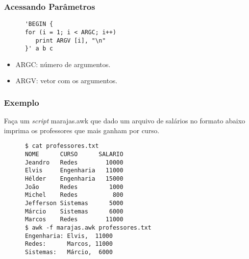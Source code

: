 \documentclass{beamer}
\begin{document}
   \begin{frame}[fragile]
      \frametitle{Acessando Parâmetros}
      \begin{verbatim}
      'BEGIN {
      for (i = 1; i < ARGC; i++)
         print ARGV [i], "\n"
      }' a b c
      \end{verbatim}
      \begin{itemize}
         \item ARGC: número de argumentos.
         \item ARGV: vetor com os argumentos.
      \end{itemize}
\end{frame}

\begin{frame}[fragile]
      \frametitle{Exemplo}
      Faça um \textit{script} marajas.awk que dado um arquivo de salários no formato abaixo imprima os professores que mais ganham por curso.
      \begin{verbatim}
      $ cat professores.txt
      NOME      CURSO      SALARIO
      Jeandro   Redes        10000
      Elvis     Engenharia   11000
      Hélder    Engenharia   15000
      João      Redes         1000
      Michel    Redes          800
      Jefferson Sistemas      5000
      Márcio    Sistemas      6000
      Marcos    Redes        11000
      $ awk -f marajas.awk professores.txt
      Engenharia: Elvis,  11000
      Redes:      Marcos, 11000
      Sistemas:   Márcio,  6000
      \end{verbatim}
\end{frame}
\end{document}
